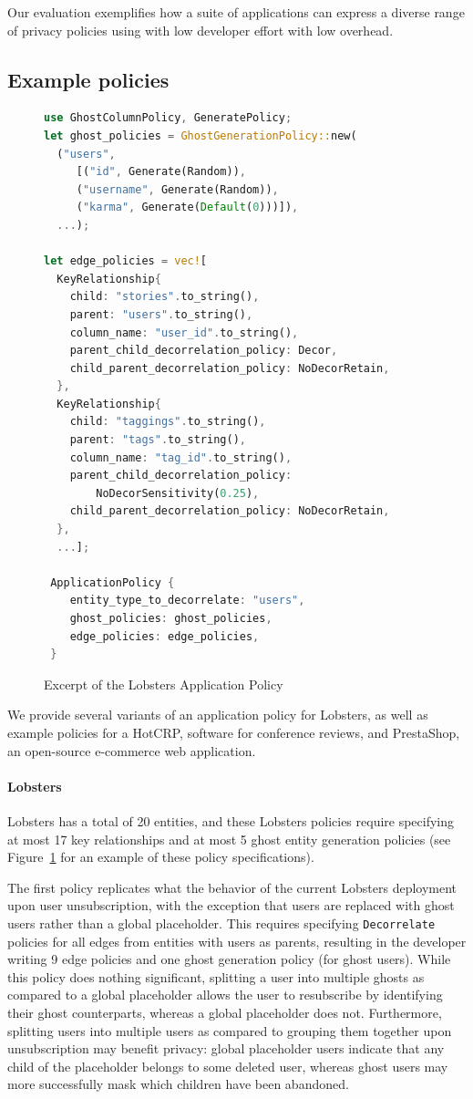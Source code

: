 Our evaluation exemplifies how a suite of applications can express a diverse
range of privacy policies using \sys with low developer effort with low overhead.

\subsection{Example policies}
\begin{figure}
\begin{lstlisting}[language=Rust]
use GhostColumnPolicy, GeneratePolicy;
let ghost_policies = GhostGenerationPolicy::new(
  ("users",
     [("id", Generate(Random)),
     ("username", Generate(Random)),
     ("karma", Generate(Default(0)))]),
  ...);

let edge_policies = vec![
  KeyRelationship{
    child: "stories".to_string(),
    parent: "users".to_string(),
    column_name: "user_id".to_string(),
    parent_child_decorrelation_policy: Decor,
    child_parent_decorrelation_policy: NoDecorRetain,
  },
  KeyRelationship{
    child: "taggings".to_string(),
    parent: "tags".to_string(),
    column_name: "tag_id".to_string(),
    parent_child_decorrelation_policy:
        NoDecorSensitivity(0.25),
    child_parent_decorrelation_policy: NoDecorRetain,
  },
  ...];

 ApplicationPolicy {
    entity_type_to_decorrelate: "users",
    ghost_policies: ghost_policies,
    edge_policies: edge_policies,
 }
\end{lstlisting}
    \label{fig:lobsters_policy}
    \caption{Excerpt of the Lobsters Application Policy}
\end{figure}
We provide several variants of an application policy for Lobsters, as well as example policies for a
HotCRP, software for conference reviews, and PrestaShop, an
open-source e-commerce web application.

\paragraph{Lobsters}
Lobsters has a total of 20 entities, and
these Lobsters policies require specifying at most 17 key
relationships and at most 5 ghost entity generation policies (see Figure~\ref{fig:lobsters_policy} for an example
of these policy specifications).

The first policy replicates what the behavior of the current Lobsters deployment upon user
unsubscription, with the exception that users are replaced with ghost users rather than a global
placeholder. This requires specifying \texttt{Decorrelate} policies for all edges from entities with users
as parents, resulting in the developer writing 9 edge policies and one ghost generation policy (for
ghost users). While this policy does nothing significant, splitting a user into multiple ghosts as
compared to a global placeholder allows the user to resubscribe by identifying their ghost
counterparts, whereas a global placeholder does not. Furthermore, splitting users into multiple
users as compared to grouping them together upon unsubscription may benefit privacy: global
placeholder users indicate that any child of the placeholder belongs to some deleted user, whereas
ghost users may more successfully mask which children have been abandoned.

